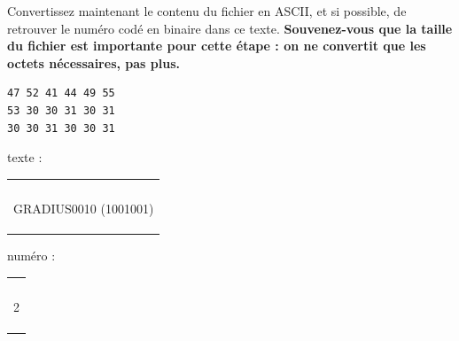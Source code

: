 \documentclass[11pt,a4paper]{article}
\begin{document}
\smallskip

Convertissez maintenant le contenu du fichier en ASCII, et si possible, de retrouver le numéro codé en binaire dans ce texte.
\textbf{Souvenez-vous que la taille du fichier est importante pour cette étape : on ne convertit que les octets nécessaires, pas plus.}

\bigskip

\begin{table}[ht!]
  \centering
  \begin{minipage}{0.3\textwidth}
    \centering

\begin{lstlisting}[style=algorithmique]
47 52 41 44 49 55
53 30 30 31 30 31
30 30 31 30 30 31
\end{lstlisting}

  \end{minipage}
  \hfillx
  \begin{minipage}{0.3\textwidth}
    \centering

texte :

\medskip

\begin{tabular}{ | m{3.5cm} | }
\hline
 \\ \\ \\ \\ GRADIUS0010  (1001001) \\ \\ \\ \\
\hline
\end{tabular}

  \end{minipage}
  \hfillx
  \begin{minipage}{0.3\textwidth}
    \centering

numéro :

\medskip

\begin{tabular}{ | m{3.5cm} | }
\hline
 \\ \\ \\ \\ 2 \\ \\ \\ \\
\hline
\end{tabular}

  \end{minipage}
\end{table}

\bigskip
\end{document}
